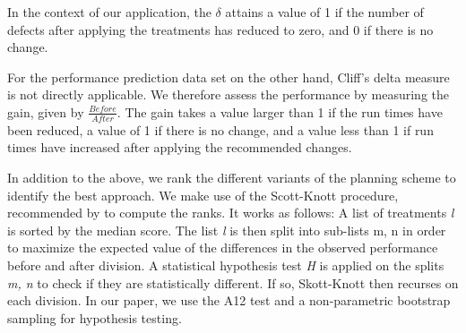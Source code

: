 \documentclass[conference]{IEEEtran}
\begin{document}
In the context of our application, the $\delta$ attains a value of 1 if the number of defects after applying the treatments has reduced to zero, and 0 if there is no change.

For the performance prediction data set on the other hand, Cliff's delta measure is not directly applicable. We therefore assess the performance by measuring the gain, given by $\frac{Before}{After}$. The gain takes a value larger than 1 if the run times have been reduced, a value of 1 if there is no change, and a value less than 1 if run times have increased after applying the recommended changes. 

In addition to the above, we rank the different variants of the planning scheme to identify the best approach. We make use of the Scott-Knott procedure, recommended by \cite{} to compute the ranks. It works as follows: A list of treatments \textit{l} is sorted by the median score. The list \textit{l} is then split into sub-lists m, n in order to maximize the expected value of the differences in the observed performance before and after division. A statistical hypothesis test \textit{H} is applied on the splits \textit{m, n} to check if they are statistically different. If so, Skott-Knott then recurses on each division. In our paper, we use the A12 test and a non-parametric bootstrap sampling for hypothesis testing. 
\end{document}
